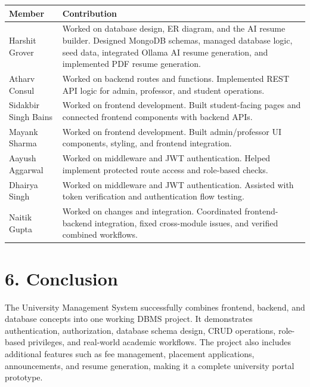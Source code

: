\documentclass[12pt]{article}
\begin{document}
\begin{longtable}{|p{4cm}|p{10cm}|}
\hline
\textbf{Member} & \textbf{Contribution} \\
\hline
Harshit Grover & Worked on database design, ER diagram, and the AI resume builder. Designed MongoDB schemas, managed database logic, seed data, integrated Ollama AI resume generation, and implemented PDF resume generation. \\
\hline
Atharv Consul & Worked on backend routes and functions. Implemented REST API logic for admin, professor, and student operations. \\
\hline
Sidakbir Singh Bains & Worked on frontend development. Built student-facing pages and connected frontend components with backend APIs. \\
\hline
Mayank Sharma & Worked on frontend development. Built admin/professor UI components, styling, and frontend integration. \\
\hline
Aayush Aggarwal & Worked on middleware and JWT authentication. Helped implement protected route access and role-based checks. \\
\hline
Dhairya Singh & Worked on middleware and JWT authentication. Assisted with token verification and authentication flow testing. \\
\hline
Naitik Gupta & Worked on changes and integration. Coordinated frontend-backend integration, fixed cross-module issues, and verified combined workflows. \\
\hline
\end{longtable}

\section*{6. Conclusion}

The University Management System successfully combines frontend, backend, and database concepts into one working DBMS project. It demonstrates authentication, authorization, database schema design, CRUD operations, role-based privileges, and real-world academic workflows. The project also includes additional features such as fee management, placement applications, announcements, and resume generation, making it a complete university portal prototype.
\end{document}

